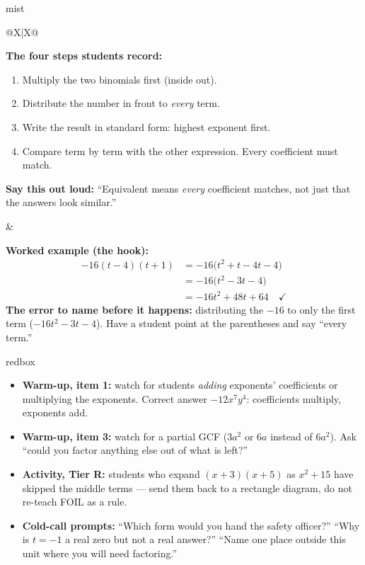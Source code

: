 \documentclass[10pt]{article}
\begin{document}
\boxguard
\begin{skillbox}{mist}
\begin{tabularx}{\linewidth}{@{}X|X@{}}
\begin{minipage}[t]{\linewidth}\vspace{0pt}
\textbf{The four steps students record:}
\begin{enumerate}[leftmargin=1.4em, itemsep=2pt, topsep=2pt]
  \item Multiply the two binomials first (inside out).
  \item Distribute the number in front to \emph{every} term.
  \item Write the result in standard form: highest exponent first.
  \item Compare term by term with the other expression. Every coefficient must match.
\end{enumerate}
\textbf{Say this out loud:} ``Equivalent means \emph{every} coefficient matches, not just that
the answers look similar.''
\end{minipage}
&
\begin{minipage}[t]{\linewidth}\vspace{0pt}
\textbf{Worked example (the hook):}
\[
\begin{aligned}
-16(t-4)(t+1) &= -16\big(t^2+t-4t-4\big) \\
              &= -16\big(t^2-3t-4\big) \\
              &= -16t^2+48t+64 \quad \checkmark
\end{aligned}
\]
\textbf{The error to name before it happens:} distributing the $-16$ to only the first term
($-16t^2-3t-4$). Have a student point at the parentheses and say ``every term.''
\end{minipage}
\end{tabularx}
\end{skillbox}

\begin{skillbox}{redbox}
\begin{itemize}[leftmargin=1.2em, itemsep=2pt, topsep=2pt]
  \item \textbf{Warm-up, item 1:} watch for students \emph{adding} exponents' coefficients or
        multiplying the exponents. Correct answer $-12x^7y^4$: coefficients multiply, exponents
        add.
  \item \textbf{Warm-up, item 3:} watch for a partial GCF ($3a^2$ or $6a$ instead of $6a^2$).
        Ask ``could you factor anything else out of what is left?''
  \item \textbf{Activity, Tier R:} students who expand $(x+3)(x+5)$ as $x^2+15$ have skipped the
        middle terms --- send them back to a rectangle diagram, do not re-teach FOIL as a rule.
  \item \textbf{Cold-call prompts:} ``Which form would you hand the safety officer?''
        ``Why is $t=-1$ a real zero but not a real answer?'' ``Name one place outside this unit
        where you will need factoring.''
\end{itemize}
\end{skillbox}
\end{document}
